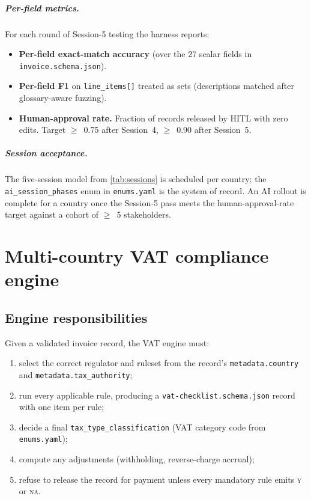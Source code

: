 \documentclass[11pt,a4paper,twoside]{report}
\begin{document}
\paragraph{Per-field metrics.} For each round of Session-5 testing the
harness reports:

\begin{itemize}
  \item \textbf{Per-field exact-match accuracy} (over the 27 scalar
        fields in \texttt{invoice.schema.json}).
  \item \textbf{Per-field F1} on \texttt{line\_items[]} treated as sets
        (descriptions matched after glossary-aware fuzzing).
  \item \textbf{Human-approval rate.} Fraction of records released by
        HITL with zero edits. Target $\geq$~0.75 after Session~4,
        $\geq$~0.90 after Session~5.
\end{itemize}

\paragraph{Session acceptance.} The five-session model from
\cref{tab:sessions} is scheduled per country; the
\texttt{ai\_session\_phases} enum in \texttt{enums.yaml} is the system
of record. An AI rollout is complete for a country once the
Session-5 pass meets the human-approval-rate target against a cohort
of $\geq$~5 stakeholders.
\chapter{Multi-country VAT compliance engine}\label{ch:vat}

\section{Engine responsibilities}

Given a validated invoice record, the VAT engine must:

\begin{enumerate}
  \item select the correct regulator and ruleset from the record's
        \texttt{metadata.country} and \texttt{metadata.tax\_authority};
  \item run every applicable rule, producing a
        \texttt{vat-checklist.schema.json} record with one item per rule;
  \item decide a final \texttt{tax\_type\_classification} (VAT category
        code from \texttt{enums.yaml});
  \item compute any adjustments (withholding, reverse-charge accrual);
  \item refuse to release the record for payment unless every
        mandatory rule emits \textsc{y} or \textsc{na}.
\end{enumerate}
\end{document}
